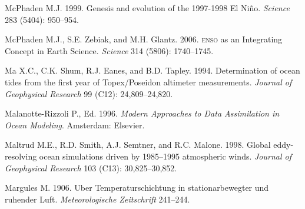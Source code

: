 \begin{thebibliography}{999}
McPhaden M.J.  1999. Genesis and evolution of the 1997-1998 El
Ni\~{n}o. \textit{Science} 283 (5404): 950--954.
%

McPhaden M.J., S.E. Zebiak, and M.H. Glantz. 2006. \textsc{enso} as an
Integrating Concept in Earth Science. \textit{Science} 314 (5806):
1740--1745.
%

Ma X.C., C.K. Shum, R.J. Eanes, and B.D. Tapley. 1994. Determination
of ocean tides from the first year of Topex/Poseidon altimeter
measurements. \textit{Journal of Geophysical Research} 99 (C12):
24,809--24,820.
%

Malanotte-Rizzoli P., Ed.  1996. \textit{Modern Approaches to Data
  Assimilation in Ocean Modeling}. Amsterdam: Elsevier.
%

Maltrud M.E., R.D. Smith, A.J. Semtner, and R.C. Malone. 1998. Global
eddy-resolving ocean simulations driven by 1985--1995 atmospheric
winds.  \textit{Journal of Geophysical Research} 103 (C13):
30,825--30,852.
%

Margules M.  1906. Uber Temperaturschichtung in stationarbewegter und
ruhender Luft. \textit{Meteorologische Zeitschrift} 241--244.
%


\end{thebibliography}
